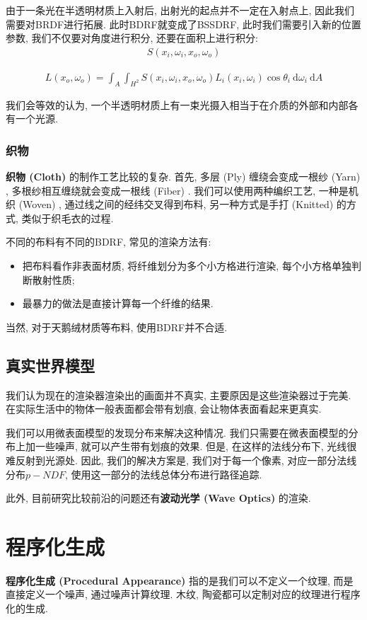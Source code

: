 由于一条光在半透明材质上入射后, 出射光的起点并不一定在入射点上, 因此我们需要对BRDF进行拓展. 此时BDRF就变成了BSSDRF, 此时我们需要引入新的位置参数, 我们不仅要对角度进行积分, 还要在面积上进行积分: 
\begin{eqnarray}
	S(x_i,\omega_i,x_o,\omega_o)
\end{eqnarray}

\begin{eqnarray}
	L\left(x_{o}, \omega_{o}\right)=\int_{A} \int_{H^{2}} S\left(x_{i}, \omega_{i}, x_{o}, \omega_{o}\right) L_{i}\left(x_{i}, \omega_{i}\right) \cos \theta_{i} \mathrm{~d} \omega_{i} \mathrm{~d} A
\end{eqnarray}

我们会等效的认为, 一个半透明材质上有一束光摄入相当于在介质的外部和内部各有一个光源. 

\subsubsection{织物}

\textbf{织物 (Cloth) }的制作工艺比较的复杂. 首先, 多层 (Ply) 缠绕会变成一根纱 (Yarn) , 多根纱相互缠绕就会变成一根线 (Fiber) . 我们可以使用两种编织工艺, 一种是机织 (Woven) , 通过线之间的经纬交叉得到布料, 另一种方式是手打 (Knitted) 的方式, 类似于织毛衣的过程. 

不同的布料有不同的BDRF, 常见的渲染方法有: 
\begin{itemize}
	\item 把布料看作非表面材质, 将纤维划分为多个小方格进行渲染, 每个小方格单独判断散射性质; 
	\item 最暴力的做法是直接计算每一个纤维的结果. 
\end{itemize}

当然, 对于天鹅绒材质等布料, 使用BDRF并不合适. 

\subsection{真实世界模型}

我们认为现在的渲染器渲染出的画面并不真实, 主要原因是这些渲染器过于完美. 在实际生活中的物体一般表面都会带有划痕, 会让物体表面看起来更真实. 

我们可以用微表面模型的发现分布来解决这种情况. 我们只需要在微表面模型的分布上加一些噪声, 就可以产生带有划痕的效果. 但是, 在这样的法线分布下, 光线很难反射到光源处. 因此, 我们的解决方案是, 我们对于每一个像素, 对应一部分法线分布$p-NDF$, 使用这一部分的法线总体分布进行路径追踪. 

此外, 目前研究比较前沿的问题还有\textbf{波动光学 (Wave Optics) }的渲染. 

\section{程序化生成}

\textbf{程序化生成 (Procedural Appearance) }指的是我们可以不定义一个纹理, 而是直接定义一个噪声, 通过噪声计算纹理. 木纹, 陶瓷都可以定制对应的纹理进行程序化的生成. 
